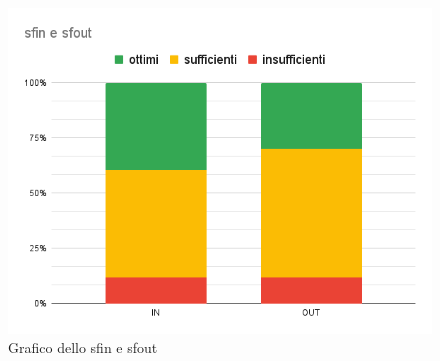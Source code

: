         \begin{figure}[H]
            \centering
            \includegraphics[width=13 cm]{source/sections/images/SfinSfout.png}
            \caption{Grafico dello sfin e sfout}
        \end{figure}
